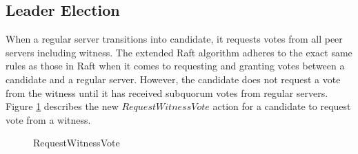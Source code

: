 \subsection{Leader Election}\label{subsection:leader-election}
When a regular server transitions into candidate, it requests votes from all peer servers including witness. The extended Raft algorithm adheres to the exact same rules as those in Raft when it comes to requesting and granting votes between a candidate and a regular server. However, the candidate does not request a vote from the witness until it has received subquorum votes from regular servers. Figure \ref{fig:request-witness-vote} describes the new $RequestWitnessVote$ action for a candidate to request vote from a witness.
\begin{figure}
    \begin{framed}
        
    \end{framed}
    \caption{RequestWitnessVote}
    \label{fig:request-witness-vote}
\end{figure}

